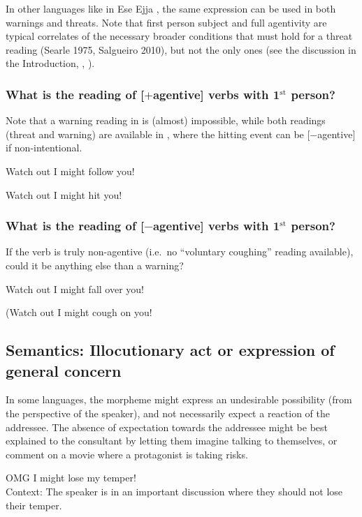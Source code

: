 \documentclass[output=paper,colorlinks,citecolor=brown]{langscibook}
\begin{document}
In other languages like in Ese Ejja \citep[274]{vuillermet2018a}, the same expression can be used in both warnings and threats. Note that first person subject and full agentivity are typical correlates of the necessary broader conditions that must hold for a threat reading (Searle 1975, Salgueiro 2010), but not the only ones (see the discussion in the Introduction, , \citealt{chapters/introduction}).


\subsubsection{What is the reading of [$+$agentive] verbs with 1$\mathrm{^{st}}$ person?}

Note that a warning reading in  is (almost) impossible, while both readings (threat and warning) are available in , where the hitting event can be [$-$agentive] if non-intentional.
\label{1.4.1}

\ea \label{p16} {\op}Watch out{\cp} I might follow you!
\z

\ea \label{p17} {\op}Watch out{\cp} I might hit you!
\z

\subsubsection{What is the reading of [$-$agentive] verbs with 1$\mathrm{^{st}}$ person?}
If the verb is truly non-agentive (i.e.\ no ``voluntary coughing'' reading available), could it be anything else than a warning?
\label{1.4.2}

\ea \label{p18} {\op}Watch out{\cp} I might fall {\op}over you{\cp}!
\z

\ea \label{p19}(Watch out{\cp} I might cough {\op}on you{\cp}!
\z


\subsection{Semantics: Illocutionary act or expression of general concern}
\label{subsec:apprsemantics}

In some languages, the morpheme might express an undesirable possibility (from the perspective of the speaker), and not necessarily expect a reaction of the addressee. The absence of expectation towards the addressee might be best explained to the consultant by letting them imagine talking to themselves, or comment on a movie where a protagonist is taking risks.

\ea \label{p20} {\op}OMG{\cp} I might lose my temper! \\
\textnormal{Context: The speaker is in an important discussion where they should not lose their temper.}
\z
\end{document}

